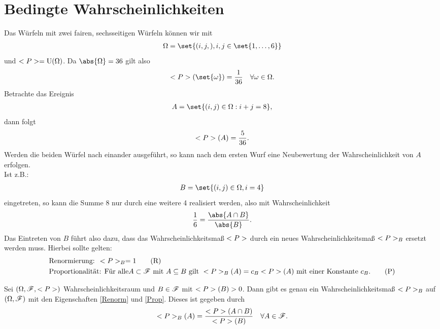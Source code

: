\section{Bedingte Wahrscheinlichkeiten}
\begin{example}
	Das Würfeln mit zwei fairen, sechsseitigen Würfeln können wir mit 
	\begin{align}
		\O = \set{(i,j,), i,j \in \set{1,\dots,6}}\notag
	\end{align}
	und $\P = \Gleich(\O)$. Da $\abs{\O} = 36$ gilt also
	\begin{align}
		\P(\set{\omega}) = \frac{1}{36} \quad \forall \omega \in \O.\notag
	\end{align}
	Betrachte das Ereignis
	\begin{align}
		A = \set{(i,j) \in \O : i + j = 8},\notag
	\end{align}
	dann folgt
	\begin{align}
		\P(A) = \frac{5}{36}.\notag
	\end{align}
	Werden die beiden Würfel nach einander ausgeführt, so kann nach dem ersten Wurf eine Neubewertung der Wahrscheinlichkeit von $A$ erfolgen.\\
	Ist z.B.:
	\begin{align}
		B = \set{(i,j) \in \O, i = 4}\notag
	\end{align}
	eingetreten, so kann die Summe 8 nur durch eine weitere 4 realisiert werden, also mit Wahrscheinlichkeit
	\begin{align}
		\frac{1}{6} = \frac{\abs{A \cap B}}{\abs{B}}.\notag 
	\end{align}
	Das Eintreten von $B$ führt also dazu, dass das Wahrscheinlichkeitsmaß $\P$ durch ein neues Wahrscheinlichkeitsmaß $\P_{B}$ ersetzt werden muss. Hierbei sollte gelten:
	\begin{align}
		 &\text{Renormierung: }\P_{B} = 1\label{Renorm}\tag{R}\\
		 &\text{Proportionalität: Für alle} A \subset \F \mit A \subseteq B \text{ gilt }
		 \P_{B}(A) = c_B \P(A) \text{ mit einer Konstante } c_B.\label{Prop}\tag{P}
    \end{align}
\end{example}

\begin{lemma}
	Sei $(\O, \F, \P)$ Wahrscheinlichkeitsraum und $B \in \F$ mit $\P(B) > 0$. Dann gibt es genau ein Wahrscheinlichkeitsmaß $\P_B$ auf $(\O, \F)$ mit den Eigenschaften \eqref{Renorm} und \eqref{Prop}. Dieses ist gegeben durch
	\begin{align}
		\P_{B}(A) = \frac{\P(A\cap B)}{\P(B)} \quad \forall A \in \F.\notag
	\end{align}
\end{lemma}

